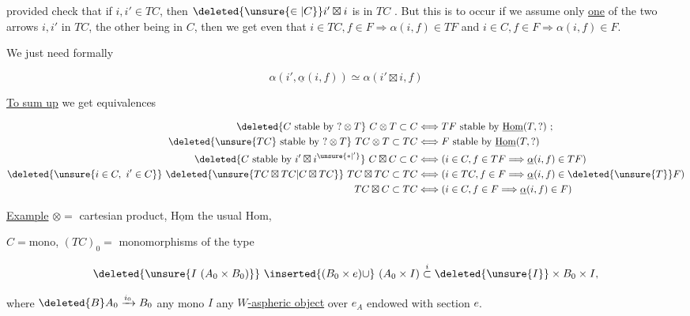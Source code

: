 

provided  check that if $i,i'\in TC$,  then $\deleted{\unsure{\in|C}}i'\boxtimes i$ is in $TC$ . But  this is to occur if we assume only \uline{one} of the two arrows $i,i'$ in $TC$, the other being in $C$, then we get even that $i\in TC,f\in F\Longrightarrow\alpha(i,f)\in TF$ and $i\in C,f\in F\Rightarrow\alpha(i,f)\in F$.

We just need formally

\[
\alpha(i',\underline{\alpha}(i,f))\simeq\alpha(i'\boxtimes i,f)
\]

\uline{To sum up} we get equivalences

\[
\begin{aligned}
\deleted{C\ \text{stable by }?\otimes T}\ C\otimes T\subset C&\Longleftrightarrow TF\ \text{stable by }\underline{\mathrm{Hom}}(T,?)\ ;\\
\deleted{\unsure{TC}\ \text{stable by }?\otimes T}\ TC\otimes T\subset TC&\Longleftrightarrow F\ \text{stable by }\underline{\mathrm{Hom}}(T,?)\\
\deleted{C\ \text{stable by }i'\boxtimes i^{\unsure{*|'}}}\ C\boxtimes C\subset C&\Longleftrightarrow(i\in C,f\in TF\Longrightarrow\underline{\alpha}(i,f)\in TF)\\
\deleted{\unsure{i\in C,\ i'\in C}}\ \deleted{\unsure{TC\boxtimes TC|C\boxtimes TC}}\ TC\boxtimes TC\subset TC&\Longleftrightarrow(i\in TC,f\in F\Longrightarrow\underline{\alpha}(i,f)\in \deleted{\unsure{T}}F)\\
TC\boxtimes C\subset TC&\Longleftrightarrow(i\in C,f\in F\Longrightarrow\underline{\alpha}(i,f)\in F)
\end{aligned}
\]


\uline{Example}  $\otimes={}$ cartesian product, $\underline{\mathrm{Hom}}$ the usual  Hom,

 $C=\mathrm{mono}$, $(TC)_0={}$ monomorphisms of the type

\[
\deleted{\unsure{I\ (A_0\times B_0)}}\ \inserted{(B_0\times e)\cup}\ (A_0\times I)\overset{i}{\subset}\deleted{\unsure{I}}\times B_0\times I,
\]

where $\deleted{B}A_0\xrightarrow{i_0}B_0$ any mono $I$ any \uline{$W$-aspheric object} over $e_A$ endowed with section $e$.

